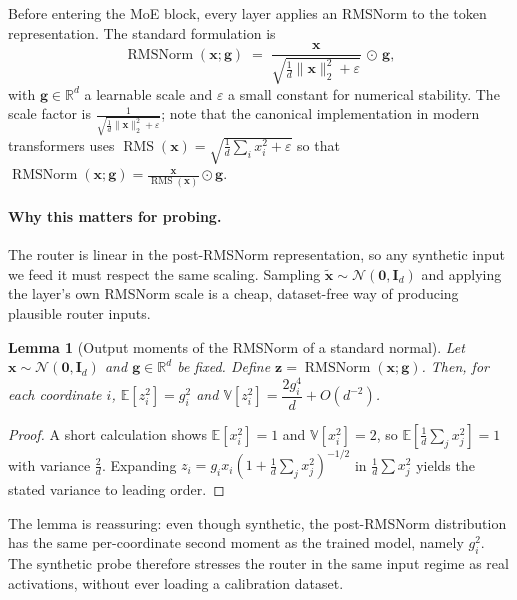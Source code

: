 \documentclass[11pt,a4paper]{article}
\newcommand{\R}{\mathbb{R}}
\newcommand{\E}{\mathbb{E}}
\newcommand{\V}{\mathbb{V}}
\newcommand{\1}{\mathbf{1}}
\newcommand{\x}{\bm{x}}
\theoremstyle{plain}
\newtheorem{lemma}{Lemma}
\begin{document}
Before entering the MoE block, every layer applies an RMSNorm to the
token representation.  The standard formulation is
\begin{equation}
  \operatorname{RMSNorm}(\x; \bm{g})
  \;=\; \frac{\x}{\sqrt{\tfrac{1}{d}\|\x\|_2^2 + \varepsilon}} \,\odot\, \bm{g},
  \label{eq:rmsnorm}
\end{equation}
with $\bm{g} \in \R^{d}$ a learnable scale and $\varepsilon$ a small
constant for numerical stability.  The scale factor is
$\frac{1}{\sqrt{\tfrac{1}{d}\|\x\|_2^2 + \varepsilon}}$; note that the
canonical implementation in modern transformers uses
$\operatorname{RMS}(\x) = \sqrt{\tfrac{1}{d}\sum_i x_i^2 + \varepsilon}$
so that $\operatorname{RMSNorm}(\x; \bm{g}) = \frac{\x}{\operatorname{RMS}(\x)} \odot \bm{g}$.

\paragraph{Why this matters for probing.}
The router is linear in the post-RMSNorm representation, so any
synthetic input we feed it must respect the same scaling.  Sampling
$\tilde{\x} \sim \mathcal{N}(\bm{0}, \bm{I}_d)$ and applying the
layer's own RMSNorm scale is a cheap, dataset-free way of producing
plausible router inputs.

\begin{lemma}[Output moments of the RMSNorm of a standard normal]
\label{lem:rms-moments}
Let $\x \sim \mathcal{N}(\bm{0}, \bm{I}_d)$ and $\bm{g} \in \R^{d}$ be
fixed.  Define
$\bm{z} = \operatorname{RMSNorm}(\x; \bm{g})$.
Then, for each coordinate $i$,
$\E[z_i^2] = g_i^2$ and
$\V[z_i^2] = \dfrac{2 g_i^4}{d} + O(d^{-2})$.
\end{lemma}

\begin{proof}
A short calculation shows
$\E[x_i^2] = 1$ and $\V[x_i^2] = 2$, so
$\E\!\left[\tfrac{1}{d}\sum_j x_j^2\right] = 1$ with
variance $\tfrac{2}{d}$.  Expanding
$z_i = g_i x_i (1 + \tfrac{1}{d}\sum_j x_j^2)^{-1/2}$ in $\tfrac{1}{d}\sum x_j^2$
yields the stated variance to leading order.
\end{proof}

The lemma is reassuring: even though synthetic, the post-RMSNorm
distribution has the same per-coordinate second moment as the trained
model, namely $g_i^2$.  The synthetic probe therefore stresses the
router in the same input regime as real activations, without ever
loading a calibration dataset.

\end{document}
